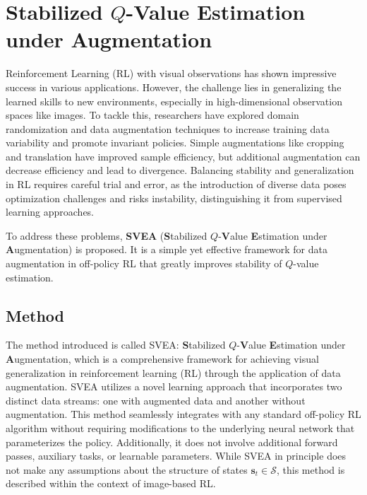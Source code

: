 \newpage
\section{Stabilized $Q$-Value Estimation under Augmentation\cite{hansen2021stabilizing}}
Reinforcement Learning (RL) with visual observations has shown impressive success in various applications. However, the challenge lies in generalizing the learned skills to new environments, especially in high-dimensional observation spaces like images. To tackle this, researchers have explored domain randomization and data augmentation techniques to increase training data variability and promote invariant policies. Simple augmentations like cropping and translation have improved sample efficiency, but additional augmentation can decrease efficiency and lead to divergence. Balancing stability and generalization in RL requires careful trial and error, as the introduction of diverse data poses optimization challenges and risks instability, distinguishing it from supervised learning approaches.

To address these problems, \textbf{SVEA} (\textbf{S}tabilized $Q$-\textbf{V}alue \textbf{E}stimation under \textbf{A}ugmentation) is proposed. It is a simple yet effective framework for data augmentation in off-policy RL that greatly improves stability of $Q$-value estimation. 

\subsection{\textbf{Method}}
The method introduced is called SVEA: \textbf{S}tabilized $Q$-\textbf{V}alue \textbf{E}stimation under \textbf{A}ugmentation, which is a comprehensive framework for achieving visual generalization in reinforcement learning (RL) through the application of data augmentation. SVEA utilizes a novel learning approach that incorporates two distinct data streams: one with augmented data and another without augmentation. This method seamlessly integrates with any standard off-policy RL algorithm without requiring modifications to the underlying neural network that parameterizes the policy. Additionally, it does not involve additional forward passes, auxiliary tasks, or learnable parameters. While SVEA in principle does not make any assumptions about the structure of states $\mathbf{s}_{t} \in \mathcal{S}$,  this method is described within the context of image-based RL.


